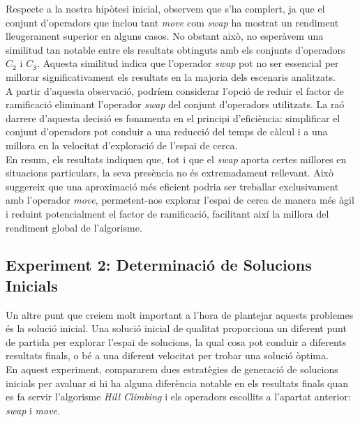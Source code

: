 \documentclass[a4paper]{article}
\begin{document}
	Respecte a la nostra hipòtesi inicial, observem que s'ha complert, ja que el conjunt d'operadors que inclou tant \textit{move} com \textit{swap} ha mostrat un rendiment lleugerament superior en alguns casos. No obstant això, no esperàvem una similitud tan notable entre els resultats obtinguts amb els conjunts d'operadors $C_{\texttt{2}}$ i $C_{\texttt{3}}$. Aquesta similitud indica que l'operador \textit{swap} pot no ser essencial per millorar significativament els resultats en la majoria dels escenaris analitzats. \\
	
	A partir d'aquesta observació, podríem considerar l'opció de reduir el factor de ramificació eliminant l'operador \textit{swap} del conjunt d'operadors utilitzats. La raó darrere d'aquesta decisió es fonamenta en el principi d'eficiència: simplificar el conjunt d'operadors pot conduir a una reducció del temps de càlcul i a una millora en la velocitat d'exploració de l'espai de cerca. \\
	
	En resum, els resultats indiquen que, tot i que el \textit{swap} aporta certes millores en situacions particulars, la seva presència no és extremadament rellevant. Això suggereix que una aproximació més eficient podria ser treballar exclusivament amb l'operador \textit{move}, permetent-nos explorar l'espai de cerca de manera més àgil i reduint potencialment el factor de ramificació, facilitant així la millora del rendiment global de l'algorisme.
	
	\subsection{Experiment 2: Determinació de Solucions Inicials}
	\label{sec:exp2}
	
	Un altre punt que creiem molt important a l'hora de plantejar aquests problemes és la solució inicial. Una solució inicial de qualitat proporciona un diferent punt de partida per explorar l'espai de solucions, la qual cosa pot conduir a diferents resultats finals, o bé a una diferent velocitat per trobar una solució òptima. \\
	
	En aquest experiment, compararem dues estratègies de generació de solucions inicials per avaluar si hi ha alguna diferència notable en els resultats finals quan es fa servir l'algorisme \textit{Hill Climbing} i els operadors escollits a l'apartat anterior: \textit{swap} i \textit{move}.\\
	
\end{document}
